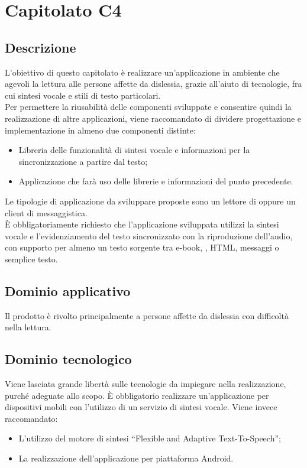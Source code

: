 \documentclass[../StudioDiFattibilita.tex]{subfiles}
\begin{document}
	\section{Capitolato C4}
		\subsection{Descrizione}
			L'obiettivo di questo capitolato è realizzare un'applicazione in ambiente  che agevoli la
			lettura alle persone affette da dislessia, grazie all'aiuto di tecnologie, fra cui
			sintesi vocale e stili di testo particolari.\\
			Per permettere la riusabilità delle componenti sviluppate e consentire quindi la realizzazione di
			altre applicazioni, viene raccomandato di dividere progettazione e implementazione in almeno due
			componenti distinte:
			\begin{itemize}
				\item Libreria delle funzionalità di sintesi vocale e informazioni per la sincronizzazione a
				partire dal testo;
				\item Applicazione che farà uso delle librerie e informazioni del punto precedente.
			\end{itemize}
			Le tipologie di applicazione da sviluppare proposte sono un lettore di  oppure un
			client di messaggistica.\\
			È obbligatoriamente richiesto che l'applicazione sviluppata utilizzi la sintesi vocale e
			l'evidenziamento del testo sincronizzato con la riproduzione dell'audio, con supporto per almeno un
			testo sorgente tra e-book, , HTML, messaggi o semplice testo.
		\subsection{Dominio applicativo}
			Il prodotto è rivolto principalmente a persone affette da dislessia con difficoltà nella lettura.
		\subsection{Dominio tecnologico}
			Viene lasciata grande libertà sulle tecnologie da impiegare nella realizzazione, purché adeguate allo
			scopo. È obbligatorio realizzare un'applicazione per dispositivi mobili con l'utilizzo di un servizio
			di sintesi vocale. Viene invece raccomandato:
			\begin{itemize}
				\item L'utilizzo del motore di sintesi ``Flexible and Adaptive Text-To-Speech'';
				\item La realizzazione dell'applicazione per piattaforma Android.
			\end{itemize}
\end{document}
